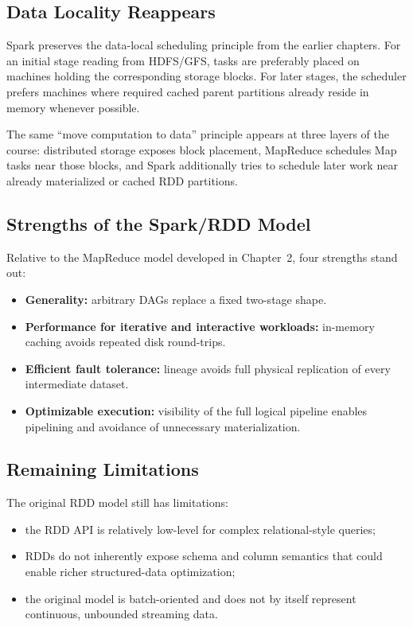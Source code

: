\documentclass[11pt,a4paper,oneside]{book}
\begin{document}
\subsection{Data Locality Reappears}

Spark preserves the data-local scheduling principle from the earlier chapters. For an initial stage reading from HDFS/GFS, tasks are preferably placed on machines holding the corresponding storage blocks. For later stages, the scheduler prefers machines where required cached parent partitions already reside in memory whenever possible.

\begin{keyconcept}
The same ``move computation to data'' principle appears at three layers of the course: distributed storage exposes block placement, MapReduce schedules Map tasks near those blocks, and Spark additionally tries to schedule later work near already materialized or cached RDD partitions.
\end{keyconcept}

\subsection{Strengths of the Spark/RDD Model}

Relative to the MapReduce model developed in Chapter~2, four strengths stand out:

\begin{itemize}
    \item \textbf{Generality:} arbitrary DAGs replace a fixed two-stage shape.
    \item \textbf{Performance for iterative and interactive workloads:} in-memory caching avoids repeated disk round-trips.
    \item \textbf{Efficient fault tolerance:} lineage avoids full physical replication of every intermediate dataset.
    \item \textbf{Optimizable execution:} visibility of the full logical pipeline enables pipelining and avoidance of unnecessary materialization.
\end{itemize}

\subsection{Remaining Limitations}

The original RDD model still has limitations:

\begin{itemize}
    \item the RDD API is relatively low-level for complex relational-style queries;
    \item RDDs do not inherently expose schema and column semantics that could enable richer structured-data optimization;
    \item the original model is batch-oriented and does not by itself represent continuous, unbounded streaming data.
\end{itemize}
\end{document}
